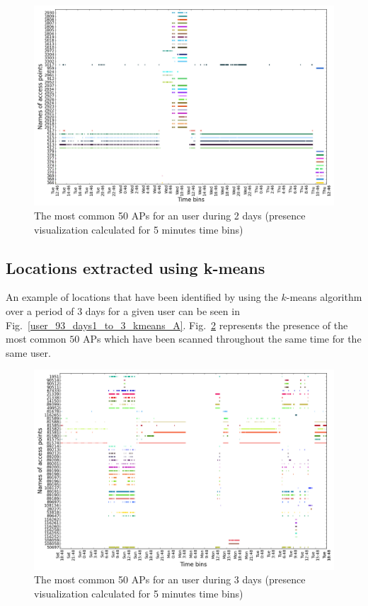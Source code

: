 \begin{figure}[!h]
\centering
\includegraphics[width=1\textwidth]{figures/presence/user_3_sorted_2days_no_rssi_plot.png}
\caption{The most common 50 APs for an user during 2 days (presence
visualization calculated for 5 minutes time bins)}
\label{user_3_pres_2d_A}
\end{figure}

\subsection{Locations extracted using k-means}
\label{appendix_kmeans}
An example of locations that have been identified by using the $k$-means
algorithm over a period of $3$ days for a given user can be seen in
Fig.~\ref{user_93_days1_to_3_kmeans_A}.
Fig.~\ref{user_93_days1_to_3_APs_presence_A} represents the presence of the most
common $50$ APs which have been scanned throughout the same time for the same
user.

\begin{figure}[!h] \centering
\includegraphics[width=\textwidth]{figures/kmeans/user_93_sorted_3days_no_rssi_plot.png}
\caption{The most common 50 APs for an user during 3 days (presence
visualization calculated for 5 minutes time bins)}
\label{user_93_days1_to_3_APs_presence_A}
\end{figure}

